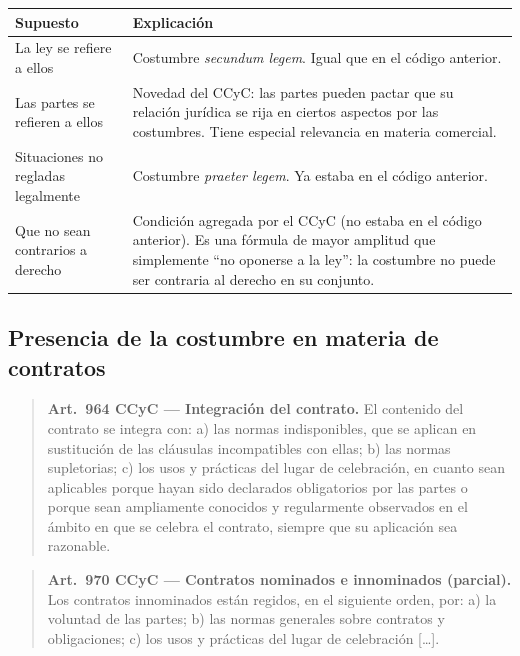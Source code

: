 \documentclass[12pt,oneside]{book}
\begin{document}
\begin{table}[H]
\centering
\begin{tabularx}{\textwidth}{>{\raggedright\arraybackslash}p{} >{\raggedright\arraybackslash}X}
\toprule
\textbf{Supuesto} & \textbf{Explicación} \\
\midrule
La ley se refiere a ellos & Costumbre \textit{secundum legem}. Igual que en el código anterior. \\
\addlinespace
Las partes se refieren a ellos & Novedad del CCyC: las partes pueden pactar que su relación jurídica se rija en ciertos aspectos por las costumbres. Tiene especial relevancia en materia comercial. \\
\addlinespace
Situaciones no regladas legalmente & Costumbre \textit{praeter legem}. Ya estaba en el código anterior. \\
\addlinespace
Que no sean contrarios a derecho & Condición agregada por el CCyC (no estaba en el código anterior). Es una fórmula de mayor amplitud que simplemente ``no oponerse a la ley'': la costumbre no puede ser contraria al derecho en su conjunto. \\
\bottomrule
\end{tabularx}
\end{table}

\subsection{Presencia de la costumbre en materia de contratos}

\begin{quote}
\textbf{Art.~964 CCyC --- Integración del contrato.} El contenido del contrato se integra con: a) las normas indisponibles, que se aplican en sustitución de las cláusulas incompatibles con ellas; b) las normas supletorias; c) los usos y prácticas del lugar de celebración, en cuanto sean aplicables porque hayan sido declarados obligatorios por las partes o porque sean ampliamente conocidos y regularmente observados en el ámbito en que se celebra el contrato, siempre que su aplicación sea razonable.
\end{quote}

\begin{quote}
\textbf{Art.~970 CCyC --- Contratos nominados e innominados (parcial).} Los contratos innominados están regidos, en el siguiente orden, por: a) la voluntad de las partes; b) las normas generales sobre contratos y obligaciones; c) los usos y prácticas del lugar de celebración [\ldots].
\end{quote}
\end{document}
